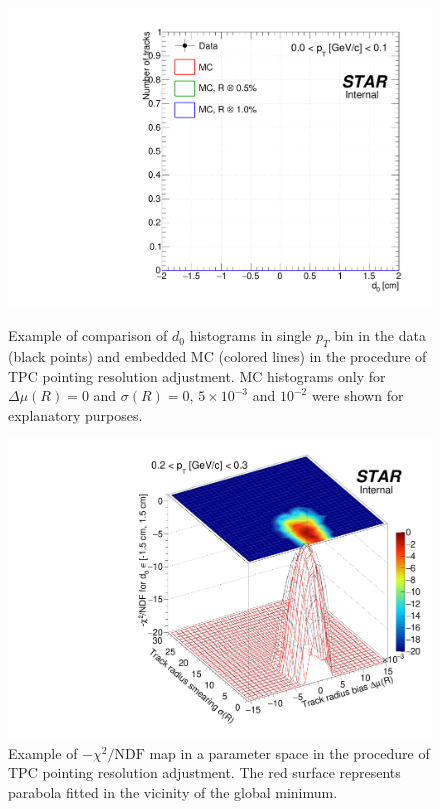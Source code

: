 \begin{figure}[t!]%
\centering%
\begin{minipage}{.4725\textwidth}%
  \centering%
  \includegraphics[width=\linewidth,page=5]{graphics/tpcHelixAdj/D0ComparisonForChiSqMinimization.pdf}%
  \caption[Example of comparison of $d_{0}$ histograms in the data and embedded MC in the procedure of TPC pointing resolution adjustment.]{Example of comparison of $d_{0}$ histograms in single $p_{T}$ bin in the data (black points) and embedded MC (colored lines) in the procedure of TPC pointing resolution adjustment. MC histograms only for $\Delta\mu(R)=0$ and $\sigma(R)=0$, $5\times10^{-3}$ and $10^{-2}$ were shown for explanatory purposes.}\label{fig:d0ForChiSqMin}
\end{minipage}%
\quad\quad%
\begin{minipage}{.4725\textwidth}%
  \centering
  \includegraphics[width=\linewidth,page=3]{graphics/tpcHelixAdj/ChiSqVsSmearingVsBias.pdf}%
  \caption[Example of $-\chi^{2}/\text{NDF}$ map in a parameter space in the procedure of TPC pointing resolution adjustment.]{Example of $-\chi^{2}/\text{NDF}$ map in a parameter space in the procedure of TPC pointing resolution adjustment. The red surface represents parabola fitted in the vicinity of the global minimum.\newline\newline}\label{fig:chiSqPerNdfTpcResAdj}
\end{minipage}%
\end{figure}%
